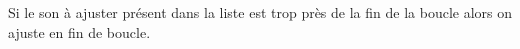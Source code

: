 
\begin{DoxyRefList}
\item[\label{todo__todo000001}%
\hypertarget{todo__todo000001}{}%
Membre \hyperlink{class_loop_ac69e73a7f3b87ecdc51e3840505b6599}{Loop.Adjust\+Sound} (Game\+Object sph)]Si le son à ajuster présent dans la liste est trop près de la fin de la boucle alors on ajuste en fin de boucle.
\end{DoxyRefList}